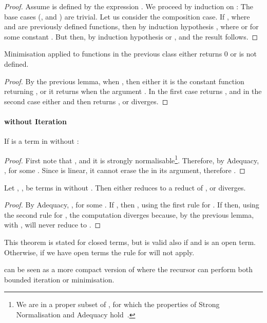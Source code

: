 \documentclass{article}
\begin{document}
\begin{proof}
Assume  is defined by the expression .
We proceed by induction on : The base cases (,  and ) are trivial. Let us consider the composition case.
If , where  and  are previously defined functions, then 
by induction hypothesis , where  or  for some constant . But then, by induction hypothesis  or , and the result follows.
\end{proof}

\begin{theorem}
Minimisation applied to functions in the previous class either returns 0 or is not defined.
\end{theorem}

\begin{proof}
By the previous lemma, when , then either it is
the constant function returning , or it returns  when the
argument . In the first case  returns , 
and in the second case either  and then  returns , or 
diverges.
\end{proof}

\paragraph{\LLCIm without Iteration}

\begin{lemma} If  is a term in \LLCIm without :

\end{lemma}
\begin{proof} First note that , and it is strongly normalisable\footnote{We are in a proper subset of \LLCI, for which the properties of Strong Normalisation and Adequacy hold~\cite{AlvesS:TCS}.}. Therefore, by Adequacy, , for some . Since  is linear, it cannot erase the  in its argument, therefore .  
\end{proof}
\begin{theorem} Let , ,  be terms in \LLCIm without . Then  either 
reduces to a reduct of , or diverges.
\end{theorem}
\begin{proof}
By Adequacy, , for some . If , then , using the first rule for .  If  then, using the second rule for , the computation diverges because, by the previous lemma,  with , will never reduce to .
\end{proof}
This theorem is stated for closed terms, but is valid also if  and  is an open term. Otherwise, if we have open terms the rule for  will not apply. 

 can be seen as a more compact version of \LLCIm where the
recursor can perform both bounded iteration or minimisation.
\end{document}

